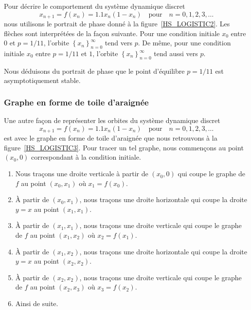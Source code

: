 {Pour décrire le comportement du système dynamique discret
\[
x_{n+1} = f(x_n) = 1.1 x_n (1-x_n) \quad \text{pour} \quad n=0,1,2,3,\ldots
\]
nous utilisons le portrait de phase donné à la
figure~\ref{HS_LOGISTIC2}.  Les flèches sont interprétées de la façon
suivante.  Pour une condition initiale $x_0$ entre $0$ et
$p = 1/11$, l'orbite $\displaystyle \left\{x_n\right\}_{n=0}^\infty$
tend vers $p$.  De même, pour une condition initiale
$x_0$ entre $p=1/11$ et $1$, l'orbite
$\displaystyle \left\{x_n\right\}_{n=0}^\infty$ tend aussi vers $p$.


Nous déduisons du portrait de phase que le point d'équilibre $p=1/11$ est
asymptotiquement stable.

\subsubsection{Graphe en forme de toile d'araignée}


Une autre façon de représenter les orbites du système dynamique
discret
\[
x_{n+1} = f(x_n) = 1.1 x_n (1-x_n) \quad \text{pour} \quad n=0,1,2,3,\ldots
\]
est avec le graphe en forme de toile d'araignée que nous retrouvons à la
figure~\ref{HS_LOGISTIC3}.  Pour tracer un tel graphe, nous commençons au
point $(x_0,0)$ correspondant à la condition initiale.
\begin{enumerate}
\item Nous traçons une droite verticale à partir de $(x_0,0)$ qui coupe le
graphe de $f$ au point $(x_0, x_1)$ où $x_1=f(x_0)$.
\item À partir de $(x_0,x_1)$, nous traçons une droite horizontale qui
coupe la droite $y=x$ au point $(x_1,x_1)$. 
\item À partir de $(x_1,x_1)$, nous traçons une droite verticale qui coupe
le graphe de $f$ au point $(x_1,x_2)$ où $x_2=f(x_1)$.
\item À partir de $(x_1,x_2)$, nous traçons une droite horizontale qui
coupe la droite $y=x$ au point $(x_2,x_2)$.
\item À partir de $(x_2,x_2)$, nous traçons une droite verticale qui coupe
le graphe de $f$ au point $(x_2,x_3)$ où $x_3=f(x_2)$.
\item Ainsi de suite.
\end{enumerate}

}
